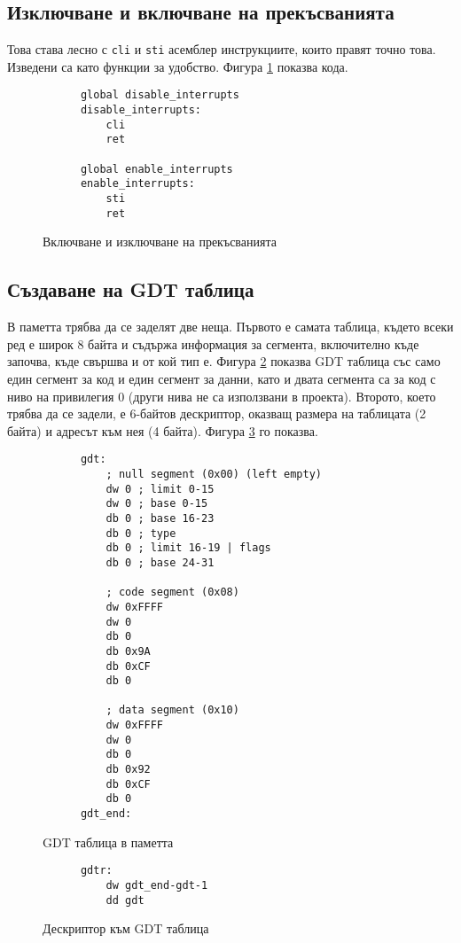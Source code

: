  \subsection{Изключване и включване на прекъсванията}
  Това става лесно с {\tt cli} и {\tt sti} асемблер инструкциите, които правят точно това. Изведени са като функции за удобство. Фигура \ref{fig:interrupt-disable} показва кода.

  \begin{figure}[htpb]
    \centering
    \caption{Включване и изключване на прекъсванията}
    \begin{verbatim}
      global disable_interrupts
      disable_interrupts:
          cli
          ret

      global enable_interrupts
      enable_interrupts:
          sti
          ret
    \end{verbatim}
    \label{fig:interrupt-disable}
  \end{figure}

  \subsection{Създаване на GDT таблица}
  В паметта трябва да се заделят две неща. Първото е самата таблица, където всеки ред е широк 8 байта и съдържа информация за сегмента, включително къде започва, къде свършва и от кой тип е. Фигура \ref{fig:gdt} показва GDT таблица със само един сегмент за код и един сегмент за данни, като и двата сегмента са за код с ниво на привилегия 0 (други нива не са използвани в проекта). Второто, което трябва да се задели, е 6-байтов дескриптор, оказващ размера на таблицата (2 байта) и адресът към нея (4 байта). Фигура \ref{fig:gdtr} го показва.

  \begin{figure}[htpb]
    \centering
    \begin{verbatim}
      gdt:
          ; null segment (0x00) (left empty)
          dw 0 ; limit 0-15
          dw 0 ; base 0-15
          db 0 ; base 16-23
          db 0 ; type
          db 0 ; limit 16-19 | flags
          db 0 ; base 24-31

          ; code segment (0x08)
          dw 0xFFFF
          dw 0
          db 0
          db 0x9A
          db 0xCF
          db 0

          ; data segment (0x10)
          dw 0xFFFF
          dw 0
          db 0
          db 0x92
          db 0xCF
          db 0
      gdt_end:
    \end{verbatim}
    \caption{GDT таблица в паметта}
    \label{fig:gdt}
  \end{figure}
  \begin{figure}[htpb]
    \centering
    \begin{verbatim}
      gdtr:
          dw gdt_end-gdt-1
          dd gdt
    \end{verbatim}
    \caption{Дескриптор към GDT таблица}
    \label{fig:gdtr}
  \end{figure}

